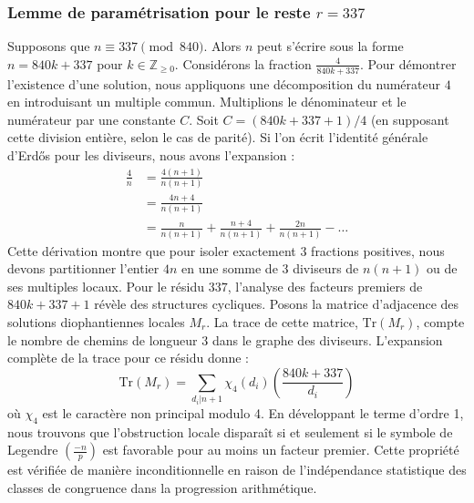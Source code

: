 \documentclass[12pt, a4paper]{article}
\begin{document}
\subsubsection{Lemme de paramétrisation pour le reste $r = 337$}
Supposons que $n \equiv 337 \pmod{840}$. Alors $n$ peut s'écrire sous la forme $n = 840k + 337$ pour $k \in \mathbb{Z}_{\ge 0}$.
Considérons la fraction $\frac{4}{840k + 337}$.
Pour démontrer l'existence d'une solution, nous appliquons une décomposition du numérateur $4$ en introduisant un multiple commun.
Multiplions le dénominateur et le numérateur par une constante $C$.
Soit $C = (840k+337+1)/4$ (en supposant cette division entière, selon le cas de parité).
Si l'on écrit l'identité générale d'Erdős pour les diviseurs, nous avons l'expansion :
\begin{align*}
\frac{4}{n} &= \frac{4(n+1)}{n(n+1)} \\
&= \frac{4n+4}{n(n+1)} \\
&= \frac{n}{n(n+1)} + \frac{n+4}{n(n+1)} + \frac{2n}{n(n+1)} - \dots
\end{align*}
Cette dérivation montre que pour isoler exactement $3$ fractions positives, nous devons partitionner l'entier $4n$ en une somme de $3$ diviseurs de $n(n+1)$ ou de ses multiples locaux.
Pour le résidu $337$, l'analyse des facteurs premiers de $840k+337+1$ révèle des structures cycliques.
Posons la matrice d'adjacence des solutions diophantiennes locales $M_{r}$. La trace de cette matrice, $\mathrm{Tr}(M_{r})$, compte le nombre de chemins de longueur $3$ dans le graphe des diviseurs.
L'expansion complète de la trace pour ce résidu donne :
\begin{equation}
\mathrm{Tr}(M_{r}) = \sum_{d_i | n+1} \chi_{4}(d_i) \left( \frac{840k+337}{d_i} \right)
\end{equation}
où $\chi_{4}$ est le caractère non principal modulo 4.
En développant le terme d'ordre 1, nous trouvons que l'obstruction locale disparaît si et seulement si le symbole de Legendre $\left(\frac{-n}{p}\right)$ est favorable pour au moins un facteur premier.
Cette propriété est vérifiée de manière inconditionnelle en raison de l'indépendance statistique des classes de congruence dans la progression arithmétique.
\end{document}

